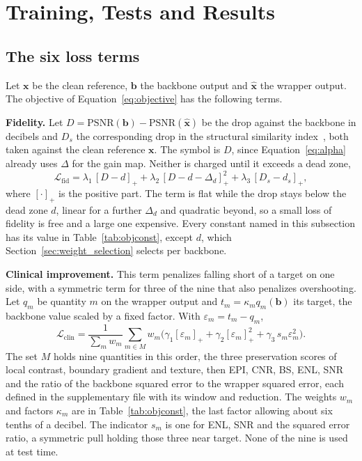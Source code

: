 \section{Training, Tests and Results}
\label{sec:tests}
\label{sec:training}

\subsection{The six loss terms}
\label{sec:loss_terms}
Let $\mathbf{x}$ be the clean reference, $\mathbf{b}$ the backbone output and $\hat{\mathbf{x}}$ the
wrapper output. The objective of Equation~\eqref{eq:objective} has the following terms.

\textbf{Fidelity.} Let $D = \mathrm{PSNR}(\mathbf{b}) - \mathrm{PSNR}(\hat{\mathbf{x}})$ be the drop
against the backbone in decibels and $D_s$ the corresponding drop in the structural similarity
index~\cite{wang2004image}, both taken against the clean reference $\mathbf{x}$. The symbol is $D$, since
Equation~\eqref{eq:alpha} already uses $\Delta$ for the gain map. Neither is charged until it exceeds
a dead zone,
\begin{equation}
\mathcal{L}_{\mathrm{fid}} = \lambda_{1}\,[D - d]_+ + \lambda_{2}\,[D - d - \Delta_d]_+^2
 + \lambda_{3}\,[D_s - d_s]_+ ,
\label{eq:loss_fid}
\end{equation}
where $[\cdot]_+$ is the positive part. The term is flat while the drop stays below the dead zone $d$,
linear for a further $\Delta_d$ and quadratic beyond, so a small loss of fidelity is free and a large
one expensive. Every constant named in this subsection has its value in Table~\ref{tab:objconst},
except $d$, which Section~\ref{sec:weight_selection} selects per backbone.

\textbf{Clinical improvement.} This term penalizes falling short of a target on one side, with a
symmetric term for three of the nine that also penalizes overshooting. Let $q_m$ be quantity $m$ on
the wrapper output and $t_m = \kappa_m q_m(\mathbf{b})$ its target, the backbone value scaled by a
fixed factor. With $\varepsilon_m = t_m - q_m$,
\begin{equation}
\mathcal{L}_{\mathrm{clin}} = \frac{1}{\sum_m w_m} \sum_{m \in M} w_m
 \Big( \gamma_{1}[\varepsilon_m]_+ + \gamma_{2}[\varepsilon_m]_+^2 + \gamma_{3}\, s_m \varepsilon_m^2 \Big).
\label{eq:loss_clin}
\end{equation}
The set $M$ holds nine quantities in this order, the three preservation scores of local contrast,
boundary gradient and texture, then EPI, CNR, BS, ENL, SNR and the ratio of the backbone squared
error to the wrapper squared error, each defined in the supplementary file with its window and
reduction. The weights $w_m$
and factors $\kappa_m$ are in Table~\ref{tab:objconst}, the last factor allowing about six tenths of
a decibel. The indicator $s_m$ is one for ENL, SNR and the squared error ratio, a symmetric pull
holding those three near target. None of the nine is used at test time.

